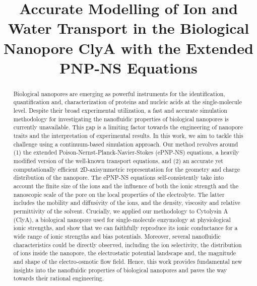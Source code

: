 \documentclass[journal=ancac3,manuscript=article,etalmode=truncate,maxauthors=0,layout=onecolumn]{achemso}
\title{Accurate Modelling of Ion and Water Transport in the Biological Nanopore ClyA with the Extended PNP-NS Equations}
\begin{document}
\begin{tocentry}
\end{tocentry}



\begin{abstract}
  \footnotesize
  Biological nanopores are emerging as powerful instruments for the identification, quantification and,
  characterization of proteins and nucleic acids at the single-molecule level. Despite their broad
  experimental utilization, a fast and accurate simulation methodology for investigating the nanofluidic
  properties of biological nanopores is currently unavailable. This gap is a limiting factor towards the
  engineering of nanopore traits and the interpretation of experimental results. In this work, we aim to
  tackle this challenge using a continuum-based simulation approach. Our method revolves around (1) the
  extended Poison-Nernst-Planck-Navier-Stokes (ePNP-NS) equations, a heavily modified version of the
  well-known transport equations, and (2) an accurate yet computationally efficient 2D-axisymmetric
  representation for the geometry and charge distribution of the nanopore. The ePNP-NS equations
  self-consistently take into account the finite size of the ions and the influence of both the ionic strength
  and the nanoscopic scale of the pore on the local properties of the electrolyte. The latter includes the
  mobility and diffusivity of the ions, and the density, viscosity and relative permittivity of the solvent.
  Crucially, we applied our methodology to Cytolysin A (ClyA), a biological nanopore used for single-molecule
  enzymology at physiological ionic strengths, and show that we can faithfully reproduce its ionic conductance
  for a wide range of ionic strengths and bias potentials. Moreover, several nanofluidic characteristics could
  be directly observed, including the ion selectivity, the distribution of ions inside the nanopore, the
  electrostatic potential landscape and, the magnitude and shape of the electro-osmotic flow field. Hence,
  this work provides fundamental new insights into the nanofluidic properties of biological nanopores and
  paves the way towards their rational engineering.
\end{abstract}



\end{document}
